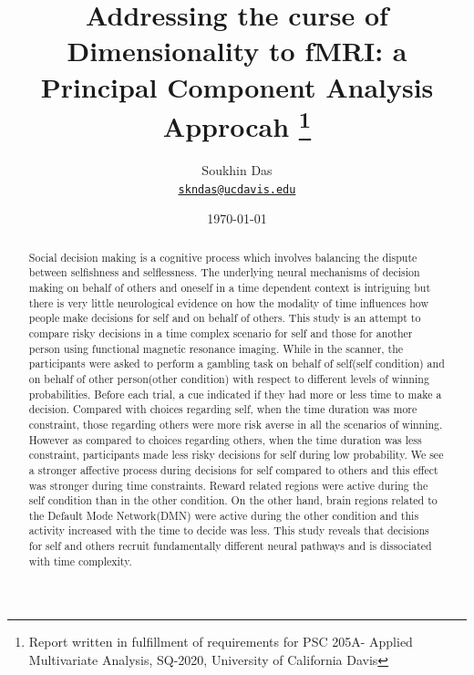 \documentclass[11pt]{article}
\title{Addressing the curse of Dimensionality to fMRI: a Principal Component Analysis Approcah
\thanks{Report written in fulfillment of requirements for PSC 205A- Applied Multivariate Analysis, SQ-2020, University of California Davis}
}
\author{Soukhin Das\\%
    \href{mailto:skndas@ucdavis.edu}{\texttt{skndas@ucdavis.edu}} %
    }
\date{\today}
\begin{document}
{
\maketitle
\begin{abstract}
Social decision making is a cognitive process which involves balancing the dispute between selfishness and selflessness.
The underlying neural mechanisms of decision making on behalf of others and oneself in a time dependent context is intriguing but there is very little neurological evidence on how the modality of time influences how people make decisions for self and on behalf of others. This study is an attempt to compare risky decisions in a time complex scenario for self and those for another person using functional magnetic resonance imaging. While in the scanner, the participants were asked to perform a gambling task on behalf of self(self condition) and on behalf of other person(other condition) with respect to different levels of winning probabilities. Before each trial, a cue indicated if they had more or less time to make a decision. Compared with choices regarding self, when the time duration was more constraint, those regarding others were more risk averse in all the scenarios of winning. However as compared to choices regarding others, when the time duration was less constraint, participants made less risky decisions for self during low probability. We see a stronger affective process during decisions for self compared to others and this effect was stronger during time constraints. Reward related regions were active during the self condition than in the other condition. On the other hand, brain regions related to the Default Mode Network(DMN) were active during the other condition and this activity increased with the time to decide was less. This study reveals that decisions for self and others recruit fundamentally different neural pathways and is dissociated with time complexity.



\end{abstract}
}

\end{document}
